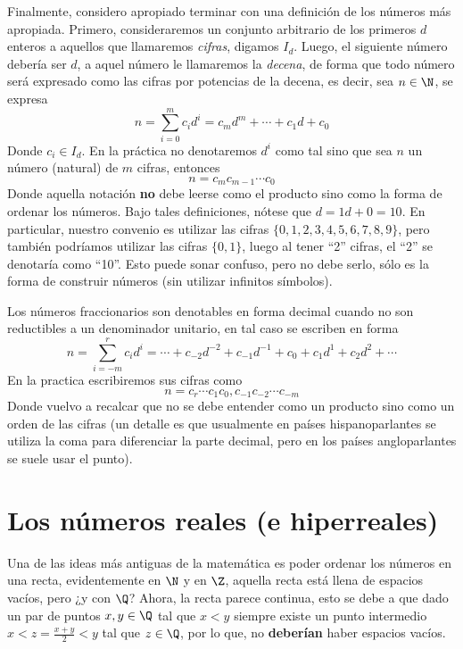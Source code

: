\documentclass[11pt,oneside,a4paper]{book}
\begin{document}
Finalmente, considero apropiado terminar con una definición de los números más apropiada. Primero, consideraremos un conjunto arbitrario de los primeros $d$ enteros a aquellos que llamaremos \textit{cifras}, digamos $I_d$. Luego, el siguiente número debería ser $d$, a aquel número le llamaremos la \textit{decena}, de forma que todo número será expresado como las cifras por potencias de la decena, es decir, sea $n\in\N$, se expresa
$$n=\sum_{i=0}^m c_id^i=c_md^m+\cdots+c_1d+c_0$$
Donde $c_i\in I_d$. En la práctica no denotaremos $d^i$ como tal sino que sea $n$ un número (natural) de $m$ cifras, entonces
$$n=c_mc_{m-1}\cdots c_0$$
Donde aquella notación \textbf{no} debe leerse como el producto sino como la forma de ordenar los números. Bajo tales definiciones, nótese que $d=1d+0=10$. En particular, nuestro convenio es utilizar las cifras $\{0,1,2,3,4,5,6,7,8,9\}$, pero también podríamos utilizar las cifras $\{0,1\}$, luego al tener ``2'' cifras, el ``2'' se denotaría como ``10''. Esto puede sonar confuso, pero no debe serlo, sólo es la forma de construir números (sin utilizar infinitos símbolos).

Los números fraccionarios son denotables en forma decimal cuando no son reductibles a un denominador unitario, en tal caso se escriben en forma
$$
n=\sum_{i=-m}^r c_id^i=\cdots+c_{-2}d^{-2}+c_{-1}d^{-1}+c_0+c_1d^1+c_2d^2+\cdots
$$
En la practica escribiremos sus cifras como
$$n=c_r\cdots c_1c_0,c_{-1}c_{-2}\cdots c_{-m}$$
Donde vuelvo a recalcar que no se debe entender como un producto sino como un orden de las cifras (un detalle es que usualmente en países hispanoparlantes se utiliza la coma para diferenciar la parte decimal, pero en los países angloparlantes se suele usar el punto).

\chapter{Los números reales (e hiperreales)}
Una de las ideas más antiguas de la matemática es poder ordenar los números en una recta, evidentemente en $\N$ y en $\Z$, aquella recta está llena de espacios vacíos, pero ¿y con $\Q$? Ahora, la recta parece continua, esto se debe a que dado un par de puntos $x,y\in\Q$ tal que $x\lt y$ siempre existe un punto intermedio $x\lt z=\frac{x+y}{2}\lt y$ tal que $z\in\Q$, por lo que, no \textbf{deberían} haber espacios vacíos.
\end{document}
